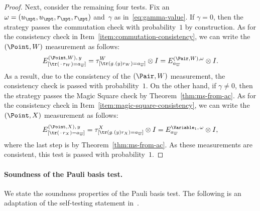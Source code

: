 \begin{proof}
  Next, consider the remaining four tests.
  Fix an $\omega= (u_\xpt, u_\zpt, r_\xpt, r_\zpt)$ and~$\gamma$ as
  in~\eqref{eq:gamma-value}.
  If $\gamma = 0$, then the strategy passes the commutation check with
  probability~$1$ by construction.
  As for the consistency check in Item~\ref{item:commutation-consistency},
  we can write the $(\Point, W)$ measurement as follows: 
  \begin{equation*}
  E^{(\Point,W),\, y}_{[\tr(\,\cdot\, r_W) = a_{\overline{w}}]}
  = \tau^W_{[\tr(g_{\cdot}(y)r_W) = a_{\overline{w}}]} \otimes I
  = E^{(\Pair, W), \omega}_{a_{\overline{w}}} \otimes I.
  \end{equation*}
  As a result, due to the consistency of the $(\Pair, W)$ measurement, the
  consistency check is passed with probability~$1$.
  On the other hand, if $\gamma \neq 0$, then the strategy passes the Magic
  Square check by Theorem~\ref{thm:ms-from-ac}.
  As for the consistency check in Item~\ref{item:magic-square-consistency}, we
  can write the $(\Point, X)$ measurement as follows:
  \begin{equation*}
  E^{(\Point,X),\, y}_{[\tr(\,\cdot\, r_X) = a_{\overline{w}}]}
  = \tau^X_{[\tr(g_{\cdot}(y)r_X) = a_{\overline{w}}]} \otimes I
  = E^{\Variable_1,\, \omega}_{a_{\overline{w}}} \otimes I,
  \end{equation*}
  where the last step is by Theorem~\ref{thm:ms-from-ac}.
  As these measurements are consistent, this test is passed with
  probability~$1$.
\end{proof}





\paragraph{Soundness of the Pauli basis test.} 
We state the soundness properties of the Pauli basis test.
The following is an adaptation of the self-testing statement in~\cite[Theorem
6.4]{NW19}.


